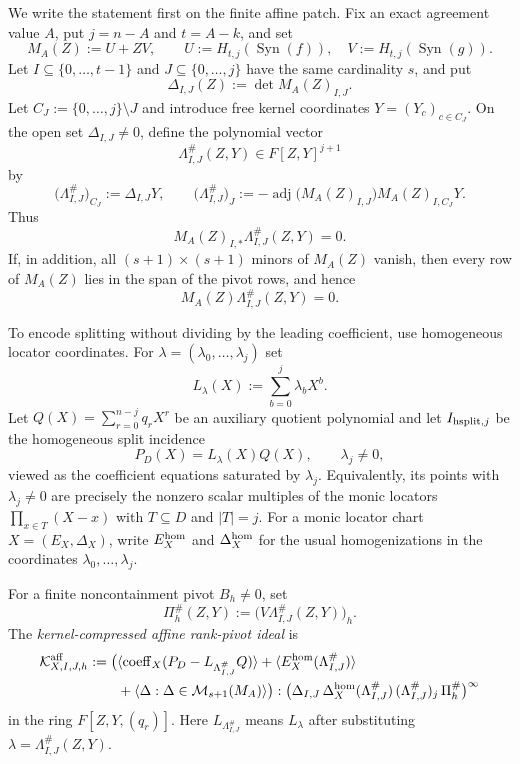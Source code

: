 \documentclass[11pt]{article}
\theoremstyle{definition}
\theoremstyle{remark}
\newcommand{\Syn}{\operatorname{Syn}}
\begin{document}
We write the statement first on the finite affine patch.  Fix an exact agreement
value $A$, put $j=n-A$ and $t=A-k$, and set
\[
        M_A(Z):=U+ZV,
        \qquad
        U:=H_{t,j}(\Syn(f)),\quad V:=H_{t,j}(\Syn(g)).
\]
Let $I\subseteq\{0,\ldots,t-1\}$ and $J\subseteq\{0,\ldots,j\}$ have the same
cardinality $s$, and put
\[
        \Delta_{I,J}(Z):=\det M_A(Z)_{I,J}.
\]
Let $C_J:=\{0,\ldots,j\}\setminus J$ and introduce free kernel coordinates
$Y=(Y_c)_{c\in C_J}$.  On the open set $\Delta_{I,J}\ne0$, define the polynomial
vector
\[
        \Lambda^{\#}_{I,J}(Z,Y)\in F[Z,Y]^{j+1}
\]
by
\[
        \bigl(\Lambda^{\#}_{I,J}\bigr)_{C_J}
        :=\Delta_{I,J}Y,
        \qquad
        \bigl(\Lambda^{\#}_{I,J}\bigr)_{J}
        :=-\operatorname{adj}\bigl(M_A(Z)_{I,J}\bigr)
             M_A(Z)_{I,C_J}Y .
\]
Thus
\[
        M_A(Z)_{I,*}\Lambda^{\#}_{I,J}(Z,Y)=0.
\]
If, in addition, all $(s+1)\times(s+1)$ minors of $M_A(Z)$ vanish, then every row
of $M_A(Z)$ lies in the span of the pivot rows, and hence
\[
        M_A(Z)\Lambda^{\#}_{I,J}(Z,Y)=0 .
\]

To encode splitting without dividing by the leading coefficient, use homogeneous
locator coordinates.  For
$\lambda=(\lambda_0,\ldots,\lambda_j)$ set
\[
        L_\lambda(X):=\sum_{b=0}^{j}\lambda_bX^b .
\]
Let $Q(X)=\sum_{r=0}^{n-j}q_rX^r$ be an auxiliary quotient polynomial and let
$I_{{\rm hsplit},j}$ be the homogeneous split incidence
\[
        P_D(X)=L_\lambda(X)Q(X),
        \qquad \lambda_j\ne0,
\]
viewed as the coefficient equations saturated by $\lambda_j$.  Equivalently,
its points with $\lambda_j\ne0$ are precisely the nonzero scalar multiples of the
monic locators $\prod_{x\in T}(X-x)$ with $T\subseteq D$ and $|T|=j$.
For a monic locator chart $X=(E_X,\Delta_X)$, write $E_X^{\rm hom}$ and
$\Delta_X^{\rm hom}$ for the usual homogenizations in the coordinates
$\lambda_0,\ldots,\lambda_j$.

For a finite noncontainment pivot $B_h\ne0$, set
\[
        \Pi_h^{\#}(Z,Y):=\bigl(V\Lambda^{\#}_{I,J}(Z,Y)\bigr)_h .
\]
The \emph{kernel-compressed affine rank-pivot ideal} is
\[
\begin{aligned}
        \mathcal K^{\rm aff}_{X,I,J,h}:=
        \bigl(&\langle \operatorname{coeff}_X(P_D-L_{\Lambda^{\#}_{I,J}}Q)\rangle
        +\langle E_X^{\rm hom}(\Lambda^{\#}_{I,J})\rangle \\
        &+\langle \Delta: \Delta\in\mathcal M_{s+1}(M_A)\rangle\bigr):
        \bigl(\Delta_{I,J}\,\Delta_X^{\rm hom}(\Lambda^{\#}_{I,J})\,
              (\Lambda^{\#}_{I,J})_j\,\Pi_h^{\#}\bigr)^\infty
\end{aligned}
\]
in the ring $F[Z,Y,(q_r)]$.  Here
$L_{\Lambda^{\#}_{I,J}}$ means $L_\lambda$ after substituting
$\lambda=\Lambda^{\#}_{I,J}(Z,Y)$.
\end{document}
